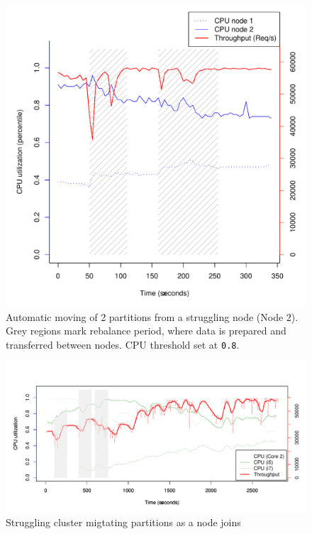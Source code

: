 \clearpage
\begin{figure}[h]
    \centering
    \includegraphics[width=1.2\textwidth]{results/adaptive_plot}
    \caption{Automatic moving of 2 partitions from a struggling node (Node 2). Grey regions mark rebalance period, where data is prepared and transferred between nodes. CPU threshold set at \texttt{0.8}.}
    \label{fig:adaptive}
\end{figure}


\clearpage
\begin{figure}[h]
    \centering
    \includegraphics[width=1.0\textwidth]{results/adaptive3node}
    \caption{Struggling cluster migtating partitions as a node joins}
    \label{fig:adapt_3node}
\end{figure}




